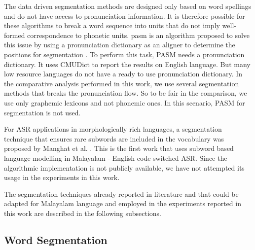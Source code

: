 The data driven segmentation methods are designed only based on word spellings
and do not have access to pronunciation information. It is therefore possible
for these algorithms to break a word sequence into units that do not imply
well-formed correspondence to phonetic units. \Gls{pasm} is an algorithm proposed to solve this issue by using a
pronunciation dictionary as an aligner to determine the positions for
segmentation \cite{PASM2019}. To perform this task, PASM needs a pronunciation
dictionary. It uses CMUDict to report the results on English language. But many
low resource languages do not have a ready to use pronunciation dictionary. In
the comparative analysis performed in this work, we use several segmentation
methods that breaks the pronunciation flow. So to be fair in the comparison, we
use only graphemic lexicons and not phonemic ones. In this scenario, PASM for
segmentation is not used.


For ASR applications in morphologically rich languages, a segmentation
technique that ensures rare subwords are included in the vocabulary was
proposed by Manghat et al. \cite{sreeja-hybrid-2022}. This is the first work
that uses subword based language modelling in Malayalam - English code switched
ASR. Since the algorithmic implementation is not publicly available, we have
not attempted its usage in the experiments in this work.

The segmentation techniques already reported in literature and that could be
adapted for Malayalam language and employed in the experiments reported in this
work are described in the following subsections.

\subsection{Word Segmentation}

